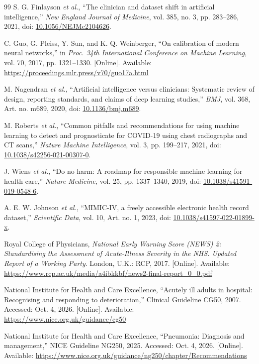 \documentclass[conference]{IEEEtran}
\begin{document}
\begin{thebibliography}{99}
S. G. Finlayson \emph{et al.}, ``The clinician and dataset shift in artificial intelligence,'' \emph{New England Journal of Medicine}, vol. 385, no. 3, pp. 283--286, 2021, doi: \href{https://doi.org/10.1056/NEJMc2104626}{10.1056/NEJMc2104626}.

C. Guo, G. Pleiss, Y. Sun, and K. Q. Weinberger, ``On calibration of modern neural networks,'' in \emph{Proc. 34th International Conference on Machine Learning}, vol. 70, 2017, pp. 1321--1330. [Online]. Available: \url{https://proceedings.mlr.press/v70/guo17a.html}

M. Nagendran \emph{et al.}, ``Artificial intelligence versus clinicians: Systematic review of design, reporting standards, and claims of deep learning studies,'' \emph{BMJ}, vol. 368, Art. no. m689, 2020, doi: \href{https://doi.org/10.1136/bmj.m689}{10.1136/bmj.m689}.

M. Roberts \emph{et al.}, ``Common pitfalls and recommendations for using machine learning to detect and prognosticate for COVID-19 using chest radiographs and CT scans,'' \emph{Nature Machine Intelligence}, vol. 3, pp. 199--217, 2021, doi: \href{https://doi.org/10.1038/s42256-021-00307-0}{10.1038/s42256-021-00307-0}.

J. Wiens \emph{et al.}, ``Do no harm: A roadmap for responsible machine learning for health care,'' \emph{Nature Medicine}, vol. 25, pp. 1337--1340, 2019, doi: \href{https://doi.org/10.1038/s41591-019-0548-6}{10.1038/s41591-019-0548-6}.

A. E. W. Johnson \emph{et al.}, ``MIMIC-IV, a freely accessible electronic health record dataset,'' \emph{Scientific Data}, vol. 10, Art. no. 1, 2023, doi: \href{https://doi.org/10.1038/s41597-022-01899-x}{10.1038/s41597-022-01899-x}.

Royal College of Physicians, \emph{National Early Warning Score (NEWS) 2: Standardising the Assessment of Acute-Illness Severity in the NHS. Updated Report of a Working Party}. London, U.K.: RCP, 2017. [Online]. Available: \url{https://www.rcp.ac.uk/media/a4ibkkbf/news2-final-report_0_0.pdf}

National Institute for Health and Care Excellence, ``Acutely ill adults in hospital: Recognising and responding to deterioration,'' Clinical Guideline CG50, 2007. Accessed: Oct. 4, 2026. [Online]. Available: \url{https://www.nice.org.uk/guidance/cg50}

National Institute for Health and Care Excellence, ``Pneumonia: Diagnosis and management,'' NICE Guideline NG250, 2025. Accessed: Oct. 4, 2026. [Online]. Available: \url{https://www.nice.org.uk/guidance/ng250/chapter/Recommendations}


\end{thebibliography}
\end{document}
